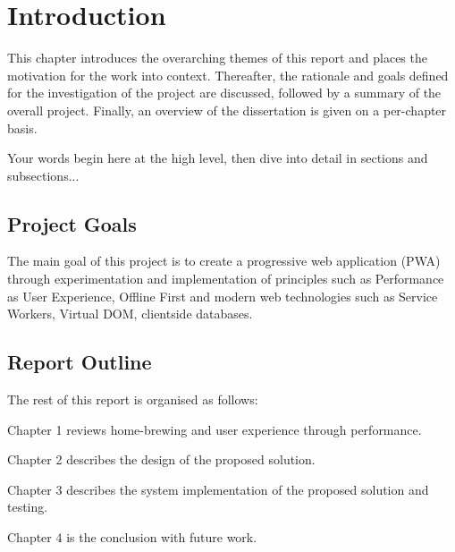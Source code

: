 \chapter{Introduction} \label{i}

This chapter introduces the overarching themes of this report and places the motivation for the work into context. Thereafter, the rationale and goals defined for the investigation of the project are discussed, followed by a summary of the overall project. Finally, an overview of the dissertation is given on a per-chapter basis.

Your words begin here at the high level, then dive into detail in sections and subsections...

\section{Project Goals} \label{i--project-goals}

The main goal of this project is to create a progressive web application (PWA) through experimentation and implementation of principles such as Performance as User Experience, Offline First and modern web technologies such as Service Workers, Virtual DOM, clientside databases.

\section{Report Outline} \label{i--report-outline}

The rest of this report is organised as follows:

Chapter 1 reviews home-brewing and user experience through performance.

Chapter 2 describes the design of the proposed solution.

Chapter 3 describes the system implementation of the proposed solution and testing.

Chapter 4 is the conclusion with future work.
